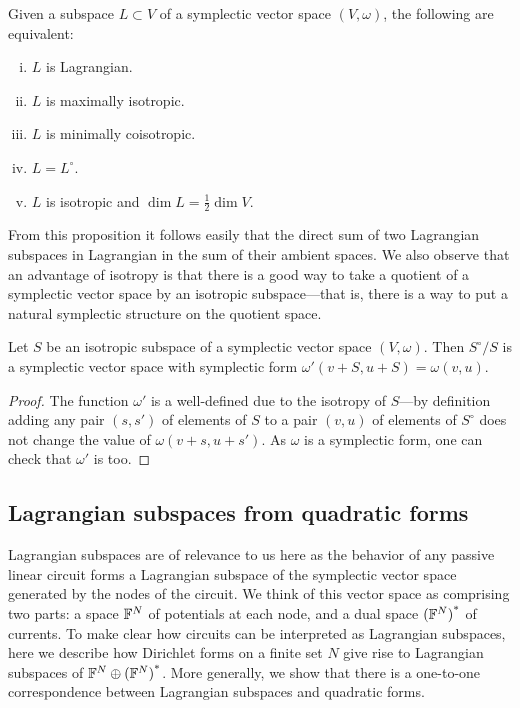 \begin{proposition} \label{lagrangian_characterization} 
  Given a subspace $L \subset V$ of a symplectic vector space $(V,\omega)$, the
  following are equivalent: 
  \begin{enumerate}[(i)] 
    \item $L$ is Lagrangian.  
    \item $L$ is maximally isotropic.  
    \item $L$ is minimally coisotropic.  
    \item $L = L^\circ$.  
    \item $L$ is isotropic and $\dim L = \frac12 \dim V$.
  \end{enumerate} 
\end{proposition}

From this proposition it follows easily that the direct sum of two Lagrangian
subspaces in Lagrangian in the sum of their ambient spaces. We also observe that
an advantage of isotropy is that there is a good way to take a quotient of a
symplectic vector space by an isotropic subspace---that is, there is a way to
put a natural symplectic structure on the quotient space.

\begin{proposition}
  Let $S$ be an isotropic subspace of a symplectic vector space $(V,\omega)$.
  Then $S^\circ/S$ is a symplectic vector space with symplectic form
  $\omega'(v+S,u+S) = \omega(v,u)$.
\end{proposition}
\begin{proof} 
  The function $\omega'$ is a well-defined due to the isotropy of
  $S$---by definition adding any pair $(s,s')$ of elements of $S$ to a pair
  $(v,u)$ of elements of $S^\circ$ does not change the value of
  $\omega(v+s,u+s')$. As $\omega$ is a symplectic form, one can check that
  $\omega'$ is too.  
\end{proof}

\subsection{Lagrangian subspaces from quadratic forms}

Lagrangian subspaces are of relevance to us here as the behavior of any passive
linear circuit forms a Lagrangian subspace of the symplectic vector space
generated by the nodes of the circuit. We think of this vector space as
comprising two parts: a space ${\mathbb F}^N$ of potentials at each node, and a dual
space ${({\mathbb F}^N)}^\ast$ of currents. To make clear how circuits can be interpreted
as Lagrangian subspaces, here we describe how Dirichlet forms on a finite set
$N$ give rise to Lagrangian subspaces of ${{\mathbb F}^{N} \oplus {({\mathbb F}^{N})}^\ast}$. More generally, we show
that there is a one-to-one correspondence between Lagrangian subspaces and
quadratic forms.

